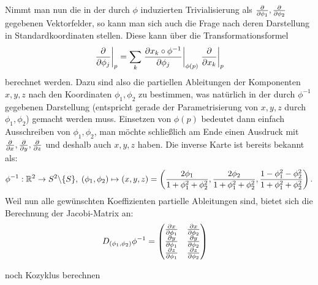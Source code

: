 \documentclass[../H_Analysis_main.tex]{subfiles}
\begin{document}
\begin{bsp}


Nimmt man nun die in der durch $\phi$ induzierten Trivialisierung als $\pdv{\phi_1}, \pdv{\phi_2}$ gegebenen Vektorfelder, so kann man sich auch die Frage nach deren Darstellung in Standardkoordinaten stellen. Diese kann über die Transformationsformel
\begin{equation*}
\eval{\pdv{\phi_j}}_p = \sum_k \eval{\pdv{x_k \circ \phi^{-1}}{\phi_j}}_{\phi(p)} \eval{\pdv{x_k}}_p
\end{equation*}
berechnet werden. Dazu sind also die partiellen Ableitungen der Komponenten $x, y, z$ nach den Koordinaten $\phi_1, \phi_2$ zu bestimmen, was natürlich in der durch $\phi^{-1}$ gegebenen Darstellung (entspricht gerade der Parametrisierung von $x, y, z$ durch $\phi_1, \phi_2$) gemacht werden muss. Einsetzen von $\phi(p)$ bedeutet dann einfach Ausschreiben von $\phi_1, \phi_2$, man möchte schließlich am Ende einen Ausdruck mit $\pdv{x}, \pdv{y}, \pdv{z}$ und deshalb auch $x, y, z$ haben. Die inverse Karte ist bereits bekannt als:
\begin{align*}
\phi^{-1}: \mathbb{R}^2 \rightarrow S^2 \backslash \qty{S}, \; (\phi_1, \phi_2) \mapsto (x, y, z) = \qty(\frac{2 \phi_1}{1 + \phi_1^2 + \phi_2^2}, \frac{2 \phi_2}{1+ \phi_1^2 + \phi_2^2}, \frac{1 - \phi_1^2 - \phi_2^2}{1 + \phi_1^2 + \phi_2^2}) \, .
\end{align*}
Weil nun alle gewünschten Koeffizienten partielle Ableitungen sind, bietet sich die Berechnung der Jacobi-Matrix an:
\begin{align}
D_{(\phi_1, \phi_2)} \phi^{-1} &= \mqty(\pdv{x}{\phi_1} & \pdv{x}{\phi_2} \\ \pdv{y}{\phi_1} & \pdv{y}{\phi_2} \\ \pdv{z}{\phi_1} & \pdv{z}{\phi_2})
\end{align}

noch Kozyklus berechnen

\end{bsp}

\end{document}
